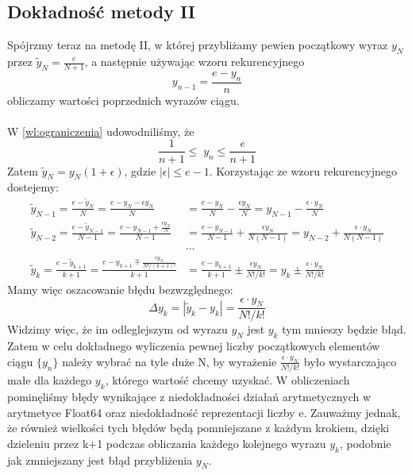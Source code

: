 \documentclass[11pt,wide]{article}
\begin{document}
\subsection{Dokładność metody II}
Spójrzmy teraz na metodę II, w której przybliżamy pewien początkowy wyraz \(y_N\) przez \(\tilde{y}_N = \frac{e}{N+1}\), a następnie używając wzoru rekurencyjnego 
\begin{equation}
y_{n-1} = \frac{e - y_n}{n}
\end{equation}
obliczamy wartości poprzednich wyrazów ciągu. \\ \\
W \eqref{wl:ograniczenia} udowodniliśmy, że 
\begin{equation}
\frac{1}{n+1} \leq \; y_n \leq \frac{e}{n+1}
\end{equation}
Zatem \(\tilde{y}_N  = y_N (1 + \epsilon ) \), gdzie \(|\epsilon | \leq e - 1 \). Korzystając ze wzoru rekurencyjnego dostejemy:
\begin{align*}
\tilde{y}_{N-1} = \frac{e - \tilde{y}_N}{N} = \frac{e - {y}_N - \epsilon {y}_N}{N} 
&= \frac{e - {y}_N}{N} - \frac{\epsilon {y}_N}{N} = {y}_{N-1} - \frac{\epsilon \cdot {y}_N}{N} \\
\tilde{y}_{N-2} = \frac{e - \tilde{y}_{N-1}}{N-1} = \frac{e - y_{N-1} + \frac{\epsilon y_N}{N}}{N-1} 
&= \frac{e - {y}_{N-1}}{N-1} +  \frac{\epsilon y_N}{N(N-1)} = {y}_{N-2} +  \frac{\epsilon \cdot y_N}{N(N-1)}\\
&\cdots \\
\tilde{y}_k = \frac{e - \tilde{y}_{k+1}}{k+1} = \frac{e - {y}_{k+1} \mp \frac{\epsilon y_N}{ N! / (k+1)!}}{k+1} 
&= \frac{e - {y}_{k+1}}{k+1} \pm \frac{\epsilon y_N}{N!/k!} = y_{k} \pm \frac{\epsilon \cdot y_N}{N!/k!} 
\end{align*}
Mamy więc oszacowanie błędu bezwzględnego:
\begin{equation}
\Delta y_k = |\tilde{y}_k - y_k| = \frac{\epsilon \cdot y_N}{N!/k!}
\end{equation}
Widzimy więc, że im odleglejszym od wyrazu \(y_N\) jest \(y_k\) tym mnieszy będzie błąd. Zatem w celu dokładnego wyliczenia pewnej liczby początkowych elementów ciągu \(\{y_n\}\) należy wybrać na tyle duże N, by wyrażenie \(\frac{\epsilon \cdot y_N}{N!/k!}\) było wystarczająco małe dla każdego \(y_k\), którego wartość chcemy uzyskać. W obliczeniach pominęliśmy błędy wynikające z niedokładności działań arytmetycznych w arytmetyce Float64 oraz niedokładność reprezentacji liczby e. Zauważmy jednak, że również wielkości tych błędów będą pomniejszane z każdym krokiem, dzięki dzieleniu przez k+1 podczas obliczania każdego kolejnego wyrazu \(y_{k}\), podobnie jak zmniejszany jest błąd przybliżenia \(y_N\).
\end{document}
